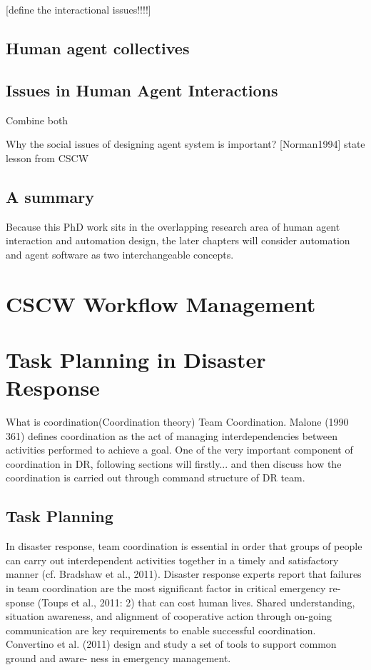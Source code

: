 [define the interactional issues!!!!]

\subsection{Human agent collectives}


\subsection{Issues in Human Agent Interactions }
Combine both 

Why the social issues of designing agent system is important? [Norman1994]
state lesson from CSCW



\subsection{A summary}

Because this PhD work sits in the overlapping research area of human agent interaction and automation design, the later chapters will consider automation and agent software as two interchangeable concepts.


\section{CSCW Workflow Management}


\section{Task Planning in Disaster Response}\label{ch:teams}

What is coordination(Coordination theory) Team Coordination. Malone (1990 361) defines coordination as the act of managing interdependencies between activities performed to achieve a goal. One of the very important component of coordination in DR, following sections will firstly... and then discuss how the coordination is carried out through command structure of DR team. 

\subsection{Task Planning}
In disaster response, team coordination is essential in order that groups of people can carry out interdependent activities together in a timely and satisfactory manner (cf. Bradshaw et al., 2011). Disaster response experts report that failures in team coordination are the most significant factor in critical emergency re- sponse (Toups et al., 2011: 2) that can cost human lives. Shared understanding, situation awareness, and alignment of cooperative action through on-going communication are key requirements to enable successful coordination. Convertino et al. (2011) design and study a set of tools to support common ground and aware- ness in emergency management. \\

